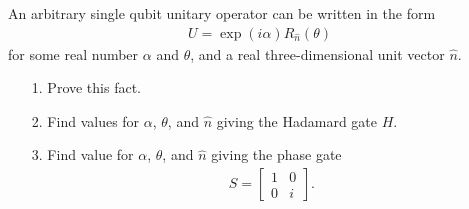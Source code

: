 \documentclass[en]{sol-man}
\begin{document}
\begin{exe}
    An arbitrary single qubit unitary operator can be written in the form
    \begin{align}
        U=\exp(i\alpha)R_{\hat{n}}(\theta)
    \end{align}
    for some real number $\alpha$ and $\theta$, and a real three-dimensional unit vector $\hat{n}$.
    \begin{itemize}
        \item[1.] Prove this fact.
        \item[2.] Find values for $\alpha$, $\theta$, and $\hat{n}$ giving the Hadamard gate $H$.
        \item[3.] Find value for $\alpha$, $\theta$, and $\hat{n}$ giving the phase gate
        \begin{align}
            S=\begin{bmatrix}
                1&0\\
                0&i
            \end{bmatrix}.
        \end{align}
    \end{itemize}
\end{exe}
\end{document}
